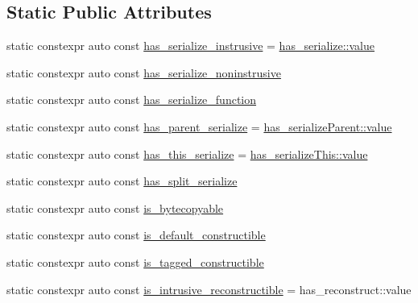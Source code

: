 \subsection*{Static Public Attributes}
\begin{DoxyCompactItemize}
\item 
static constexpr auto const \hyperlink{structcheckpoint_1_1_serializable_traits_a9e6855e572198a99854e9e8d2ac8b9d7}{has\+\_\+serialize\+\_\+instrusive} = \hyperlink{structdetection_1_1detector_a6d7d0e1bdf5903db9edbe448edccf83b}{has\+\_\+serialize\+::value}
\item 
static constexpr auto const \hyperlink{structcheckpoint_1_1_serializable_traits_a2b02dea52e9cce1e6ec8e251c414e2e5}{has\+\_\+serialize\+\_\+noninstrusive}
\item 
static constexpr auto const \hyperlink{structcheckpoint_1_1_serializable_traits_a4d17a7627a8e033cccb5cf4e6b8fd0dc}{has\+\_\+serialize\+\_\+function}
\item 
static constexpr auto const \hyperlink{structcheckpoint_1_1_serializable_traits_a122e712dd9adffac78f239a7c30b0a8f}{has\+\_\+parent\+\_\+serialize} = \hyperlink{structdetection_1_1detector_a6d7d0e1bdf5903db9edbe448edccf83b}{has\+\_\+serialize\+Parent\+::value}
\item 
static constexpr auto const \hyperlink{structcheckpoint_1_1_serializable_traits_ab228ede8ce64a9aaebf9ce43ac388400}{has\+\_\+this\+\_\+serialize} = \hyperlink{structdetection_1_1detector_a6d7d0e1bdf5903db9edbe448edccf83b}{has\+\_\+serialize\+This\+::value}
\item 
static constexpr auto const \hyperlink{structcheckpoint_1_1_serializable_traits_a1fa333e360a0dfeafebe350436ae9141}{has\+\_\+split\+\_\+serialize}
\item 
static constexpr auto const \hyperlink{structcheckpoint_1_1_serializable_traits_a19e58ea0f510be10502e476258ed14ae}{is\+\_\+bytecopyable}
\item 
static constexpr auto const \hyperlink{structcheckpoint_1_1_serializable_traits_a4bdbe26cdd11c7ff07f84e4cfdf34e7f}{is\+\_\+default\+\_\+constructible}
\item 
static constexpr auto const \hyperlink{structcheckpoint_1_1_serializable_traits_aa6618d9f36e37127006112c73755fceb}{is\+\_\+tagged\+\_\+constructible}
\item 
static constexpr auto const \hyperlink{structcheckpoint_1_1_serializable_traits_a9879da69f4597dfb32b869142c1c46c9}{is\+\_\+intrusive\+\_\+reconstructible} = has\+\_\+reconstruct\+::value
\item 

\end{DoxyCompactItemize}
